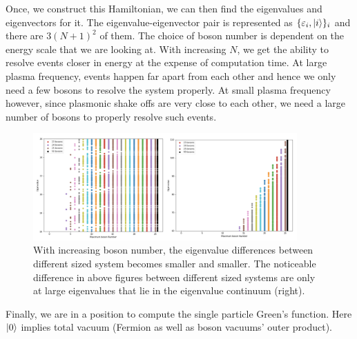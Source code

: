\documentclass{article}
\begin{document}
Once, we construct this Hamiltonian, we can then find the eigenvalues and eigenvectors for it. The eigenvalue-eigenvector pair is represented as $\{\varepsilon_i, \ket{i}\}_i$ and there are $3(N+1)^2$ of them. The choice of boson number is dependent on the energy scale that we are looking at. With increasing $N$, we get the ability to resolve events closer in energy at the expense of computation time. At large plasma frequency, events happen far apart from each other and hence we only need a few bosons to resolve the system properly. At small plasma frequency however, since plasmonic shake offs are very close to each other, we need a large number of bosons to properly resolve such events.
\begin{figure}[H]
    \centering
    \includegraphics[width = 0.9\textwidth]{Eigenvalue.001.png}
    \caption{With increasing boson number, the eigenvalue differences between different sized system becomes smaller and smaller. The noticeable difference in above figures between different sized systems are only at large eigenvalues that lie in the eigenvalue continuum (right).}
    \label{Eigenvalue_spectra}
\end{figure}

Finally, we are in a position to compute the single particle Green's function. Here $\ket{0}$ implies total vacuum (Fermion as well as boson vacuums' outer product).
\end{document}
